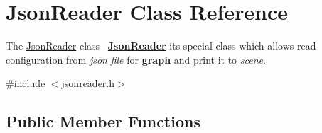 \hypertarget{class_json_reader}{}\section{Json\+Reader Class Reference}
\label{class_json_reader}


The \mbox{\hyperlink{class_json_reader}{Json\+Reader}} class~\newline
{\bfseries{\mbox{\hyperlink{class_json_reader}{Json\+Reader}}}} it\textquotesingle{}s special class which allows read configuration from {\itshape json} {\itshape file} for {\bfseries{graph}} and print it to {\itshape scene}.  




{\ttfamily \#include $<$jsonreader.\+h$>$}

\subsection*{Public Member Functions}
